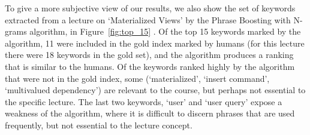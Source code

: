 To give a more subjective view of our results, we also show the set of keywords extracted from a lecture on `Materialized Views' by the Phrase Boosting with N-grams algorithm, in Figure~\ref{fig:top_15} . Of the top 15 keywords marked by the algorithm, 11 were included in the gold index marked by humans (for this lecture there were 18 keywords in the gold set), and the algorithm produces a ranking that is similar to the humans. Of the keywords ranked highly by the algorithm that were not in the gold index, some (`materialized', `insert command', `multivalued dependency') are relevant to the course, but perhaps not essential to the specific lecture. The last two keywords, `user' and `user query' expose a weakness of the algorithm, where it is difficult to discern phrases that are used frequently, but not essential to the lecture concept.
